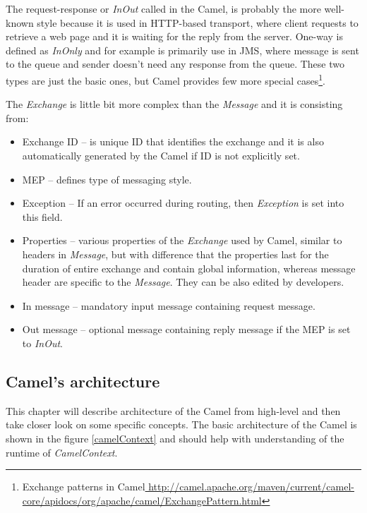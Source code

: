 \documentclass[12pt,final,oneside]{fithesis2}
\begin{document}
The request-response or \textit{InOut} called in the Camel, is probably the more well-known style because it is used in HTTP-based transport, where client requests to retrieve a web page and it is waiting for the reply from the server. One-way is defined as \textit{InOnly} and for example is primarily use in JMS, where message is sent to the queue and sender doesn't need any response from the queue. These two types are just the basic ones, but Camel provides few more special cases\footnote{Exchange patterns in Camel\url{
http://camel.apache.org/maven/current/camel-core/apidocs/org/apache/camel/ExchangePattern.html}}.\cite{camel-exchange}

The \textit{Exchange} is little bit more complex than the \textit{Message} and it is consisting from\cite{camel-in-action}:
\begin{itemize}
\item
Exchange ID -- is unique ID that identifies the exchange and it is also automatically generated by the Camel if ID is not explicitly set.

\item
MEP -- defines type of messaging style.

\item
Exception -- If an error occurred during routing, then \textit{Exception} is set into this field.

\item
Properties -- various properties of the \textit{Exchange} used by Camel, similar to headers in \textit{Message}, but with difference that the properties last for the duration of entire exchange and contain global information, whereas message header are specific to the \textit{Message}. They can be also edited by developers.

\item
In message -- mandatory input message containing request message.

\item
Out message -- optional message containing reply message if the MEP is set to \textit{InOut}.
\end{itemize}


\subsection{Camel's architecture}
This chapter will describe architecture of the Camel from high-level and then take closer look on some specific concepts. The basic architecture of the Camel is shown in the figure \ref{camelContext} and should help with understanding of the runtime of \textit{CamelContext}.
\end{document}
